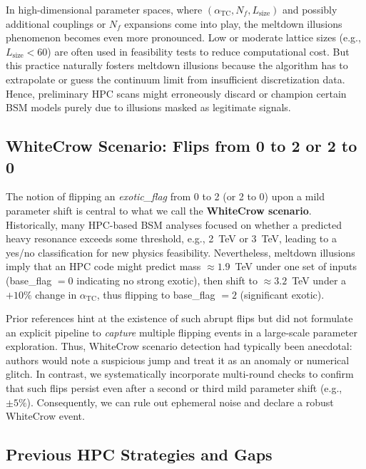 \documentclass[11pt]{article}
\begin{document}
In high-dimensional parameter spaces, 
where $(\alpha_{\mathrm{TC}}, N_f, L_{\mathrm{size}})$ and possibly 
additional couplings or $N_f$ expansions come into play, 
the meltdown illusions phenomenon becomes even more pronounced. 
Low or moderate lattice sizes (e.g., $L_{\mathrm{size}} < 60$) 
are often used in feasibility tests to reduce computational cost. 
But this practice naturally fosters meltdown illusions 
because the algorithm has to extrapolate or guess 
the continuum limit from insufficient discretization data. 
Hence, preliminary HPC scans might erroneously discard 
or champion certain BSM models purely due to illusions 
masked as legitimate signals.

\subsection{WhiteCrow Scenario: Flips from 0 to 2 or 2 to 0}

The notion of flipping an \textit{exotic\_flag} from 0 to 2 
(or 2 to 0) upon a mild parameter shift is central 
to what we call the \textbf{WhiteCrow scenario}. 
Historically, many HPC-based BSM analyses 
focused on whether a predicted heavy resonance 
exceeds some threshold, e.g., 2~TeV or 3~TeV, 
leading to a yes/no classification for new physics feasibility. 
Nevertheless, meltdown illusions imply 
that an HPC code might predict mass $\approx 1.9$~TeV under one set of inputs 
(base\_flag $= 0$ indicating no strong exotic), 
then shift to $\approx 3.2$~TeV under a $+10\%$ change in $\alpha_{\mathrm{TC}}$, 
thus flipping to base\_flag $= 2$ (significant exotic).

Prior references \cite{whitecrowInitialRef, meltdownRef} 
hint at the existence of such abrupt flips 
but did not formulate an explicit pipeline to \textit{capture} 
multiple flipping events in a large-scale parameter exploration. 
Thus, WhiteCrow scenario detection had typically been anecdotal: 
authors would note a suspicious jump 
and treat it as an anomaly or numerical glitch. 
In contrast, we systematically incorporate 
multi-round checks to confirm that such flips persist 
even after a second or third mild parameter shift (e.g., $\pm 5\%$). 
Consequently, we can rule out ephemeral noise 
and declare a robust WhiteCrow event.

\subsection{Previous HPC Strategies and Gaps}
\end{document}
